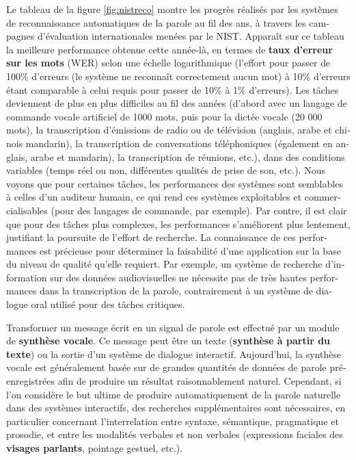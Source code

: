 \begin{french}
\begin{multicols}{2}
Le tableau de la figure \ref{fig:nistreco} montre les progrès réalisés
par les systèmes de reconnaissance automatiques de la parole au fil
des ans, à travers les campagnes d'évaluation internationales
menées par le NIST. Apparaît sur ce tableau la meilleure performance
obtenue cette année-là, en termes de {\bf taux d'erreur sur
  les mots} (WER) selon une échelle logarithmique (l'effort
pour passer de 100\% d'erreurs (le système ne reconnaît
correctement aucun mot) à 10\% d'erreurs étant comparable à
celui requis pour passer de 10\% à 1\% d'erreurs). Les tâches
deviennent de plus en plus difficiles au fil des années (d'abord avec un langage de commande vocale artificiel de 1000 mots,
puis pour la dictée vocale (20 000 mots), la transcription d'émissions de radio ou de télévision (anglais, arabe et chinois
mandarin), la transcription de conversations téléphoniques (également
en anglais, arabe et mandarin), la transcription de réunions, etc.),
dans des conditions variables (temps réel ou non, différentes qualités
de prise de son, etc.). Nous voyons que pour certaines tâches, les
performances des systèmes sont semblables à celles d'un
auditeur humain, ce qui rend ces systèmes exploitables et
commercialisables (pour des langages de commande, par exemple). Par
contre, il est clair que pour des tâches plus complexes, les
performances s'améliorent plus lentement, justifiant la
poursuite de l'effort de recherche. La connaissance de ces
performances est précieuse pour déterminer la faisabilité d'une application sur la base du niveau de qualité qu'elle
requiert. Par exemple, un système de recherche d'information 
sur des données audiovisuelles ne nécessite pas de très hautes
performances dans la transcription de la parole, contrairement à un
système de dialogue oral utilisé pour des tâches critiques.

Transformer un message écrit en un signal de parole est effectué par
un module de {\bf synthèse vocale}. Ce message peut être un texte
({\bf synthèse à partir du texte}) ou la sortie d'un système de dialogue
interactif. Aujourd'hui, la synthèse vocale est généralement basée sur
de grandes quantités de données de parole préenregistrées afin de
produire un résultat raisonnablement naturel. Cependant, si l'on
considère le but ultime de produire automatiquement de la parole
naturelle dans des systèmes interactifs, des recherches
supplémentaires sont nécessaires, en particulier concernant
l'interrelation entre syntaxe, sémantique, pragmatique et prosodie, et
entre les modalités verbales et non verbales (expressions faciales des
{\bf visages parlants}, pointage gestuel, etc.).


\end{multicols}
\end{french}
